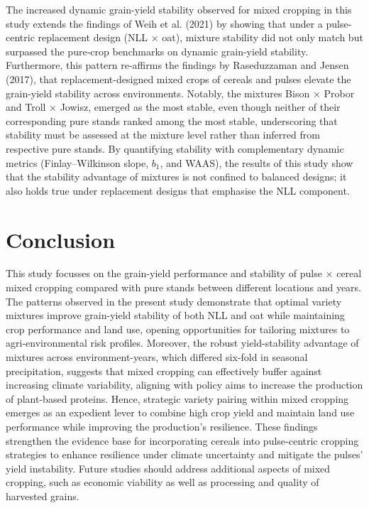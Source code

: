 \documentclass[
  british,
  a4paper,
  DIV=11,
  numbers=noendperiod]{scrreprt}
\begin{document}
The increased dynamic grain-yield stability observed for mixed cropping
in this study extends the findings of Weih et al. (2021) by showing that
under a pulse-centric replacement design (NLL × oat), mixture stability
did not only match but surpassed the pure‑crop benchmarks on dynamic
grain-yield stability. Furthermore, this pattern re-affirms the findings
by Raseduzzaman and Jensen (2017), that replacement-designed mixed crops
of cereals and pulses elevate the grain-yield stability across
environments. Notably, the mixtures Bison × Probor and Troll × Jowisz,
emerged as the most stable, even though neither of their corresponding
pure stands ranked among the most stable, underscoring that stability
must be assessed at the mixture level rather than inferred from
respective pure stands. By quantifying stability with complementary
dynamic metrics (Finlay--Wilkinson slope, \(b_{1}\), and WAAS), the
results of this study show that the stability advantage of mixtures is
not confined to balanced designs; it also holds true under replacement
designs that emphasise the NLL component.

\chapter{Conclusion}\label{conclusion}

This study focusses on the grain-yield performance and stability of
pulse × cereal mixed cropping compared with pure stands between
different locations and years. The patterns observed in the present
study demonstrate that optimal variety mixtures improve grain-yield
stability of both NLL and oat while maintaining crop performance and
land use, opening opportunities for tailoring mixtures to
agri-environmental risk profiles. Moreover, the robust yield-stability
advantage of mixtures across environment-years, which differed six‑fold
in seasonal precipitation, suggests that mixed cropping can effectively
buffer against increasing climate variability, aligning with policy aims
to increase the production of plant-based proteins. Hence, strategic
variety pairing within mixed cropping emerges as an expedient lever to
combine high crop yield and maintain land use performance while
improving the production's resilience. These findings strengthen the
evidence base for incorporating cereals into pulse-centric cropping
strategies to enhance resilience under climate uncertainty and mitigate
the pulses' yield instability. Future studies should address additional
aspects of mixed cropping, such as economic viability as well as
processing and quality of harvested grains.
\end{document}
